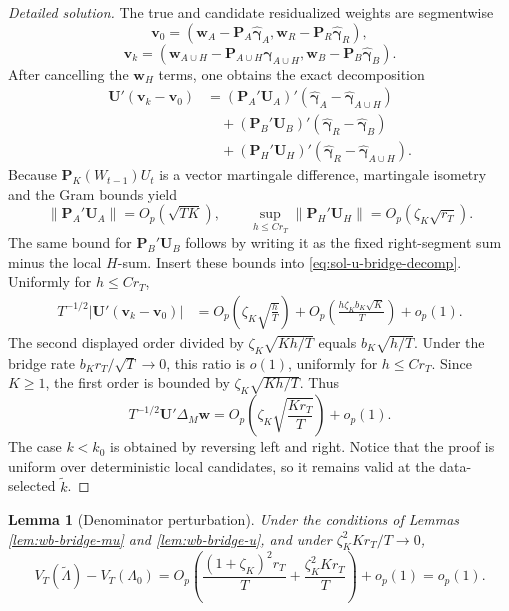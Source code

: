 \documentclass[12pt]{article}
\numberwithin{equation}{section}
\newtheorem{lemma}{Lemma}
\theoremstyle{definition}
\begin{document}
\begin{proof}[Detailed solution]
The true and candidate residualized weights are segmentwise
\[
    \bm v_0=(\bm w_A-\bm P_A\widehat{\bm\gamma}_A,
             \bm w_R-\bm P_R\widehat{\bm\gamma}_R),
\]
\[
    \bm v_k=(\bm w_{A\cup H}-
              \bm P_{A\cup H}\widehat{\bm\gamma}_{A\cup H},
             \bm w_B-\bm P_B\widehat{\bm\gamma}_B).
\]
After cancelling the \(\bm w_H\) terms, one obtains the exact decomposition
\begin{align}
    \bm U'(\bm v_k-\bm v_0)
    &= (\bm P_A'\bm U_A)'
       (\widehat{\bm\gamma}_A-
        \widehat{\bm\gamma}_{A\cup H})
       \nonumber\\
    &\quad +(\bm P_B'\bm U_B)'
       (\widehat{\bm\gamma}_R-
        \widehat{\bm\gamma}_{B})
       \nonumber\\
    &\quad +(\bm P_H'\bm U_H)'
       (\widehat{\bm\gamma}_R-
        \widehat{\bm\gamma}_{A\cup H}).
    \label{eq:sol-u-bridge-decomp}
\end{align}
Because \(\bm P_K(W_{t-1})U_t\) is a vector martingale difference, martingale
isometry and the Gram bounds yield
\[
    \|\bm P_A'\bm U_A\|=O_p(\sqrt{TK}),
    \qquad
    \sup_{h\leq Cr_T}\|\bm P_H'\bm U_H\|
      =O_p(\zeta_K\sqrt{r_T}).
\]
The same bound for \(\bm P_B'\bm U_B\) follows by writing it as the fixed
right-segment sum minus the local \(H\)-sum.  Insert these bounds into
\eqref{eq:sol-u-bridge-decomp}.  Uniformly for \(h\leq Cr_T\),
\begin{align*}
    T^{-1/2}|\bm U'(\bm v_k-\bm v_0)|
    &=O_p\left(\zeta_K\sqrt{\frac{h}{T}}\right)
      +O_p\left(\frac{h\zeta_Kb_K\sqrt K}{T}\right)
      +o_p(1).
\end{align*}
The second displayed order divided by
\(\zeta_K\sqrt{Kh/T}\) equals \(b_K\sqrt{h/T}\).  Under the bridge rate
\(b_Kr_T/\sqrt T\to0\), this ratio is \(o(1)\), uniformly for
\(h\leq Cr_T\).  Since \(K\geq1\), the first order is bounded by
\(\zeta_K\sqrt{Kh/T}\).  Thus
\[
    T^{-1/2}\bm U'\Delta_M\bm w
    =O_p\left(\zeta_K\sqrt{\frac{Kr_T}{T}}\right)+o_p(1).
\]
The case \(k<k_0\) is obtained by reversing left and right.  Notice that the
proof is uniform over deterministic local candidates, so it remains valid at
the data-selected \(\widetilde k\).
\end{proof}


\begin{lemma}[Denominator perturbation]
\label{lem:wb-bridge-v}
Under the conditions of Lemmas \ref{lem:wb-bridge-mu} and
\ref{lem:wb-bridge-u}, and under \(\zeta_K^2Kr_T/T\to0\),
\[
    V_T(\widetilde\Lambda)-V_T(\Lambda_0)
    =
    O_p\!\left(
      \frac{(1+\zeta_K)^2r_T}{T}
      +
      \frac{\zeta_K^2Kr_T}{T}
    \right)+o_p(1)
    =o_p(1).
\]
\end{lemma}
\end{document}

